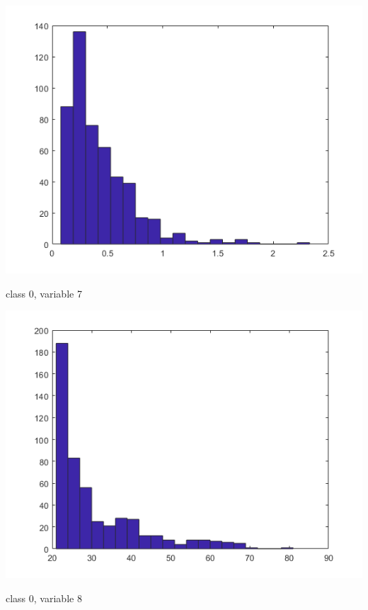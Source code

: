 \documentclass[a4paper]{article}
\begin{document}
\begin{center}
    \includegraphics[scale=1]{0-7.png}
    \caption{class 0, variable 7}
\end{center}

\begin{center}
    \includegraphics[scale=1]{0-8.png}
    \caption{class 0, variable 8}
\end{center}
\end{document}
